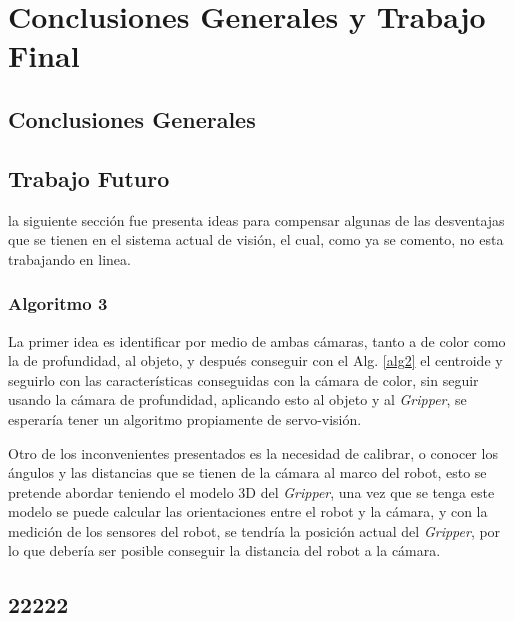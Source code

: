 \chapter{Conclusiones Generales y Trabajo Final}











\section{Conclusiones Generales}



\section{Trabajo Futuro}

la siguiente sección fue presenta ideas para compensar algunas de las desventajas que se tienen en el sistema actual de visión, el cual, como ya se comento, no esta trabajando en linea.

\subsection{Algoritmo  3}

La primer idea es identificar por medio de ambas cámaras, tanto a de color como la de profundidad, al objeto, y después conseguir con el Alg. \ref{alg2} el centroide y seguirlo con las características conseguidas con la cámara de color, sin seguir usando la cámara de profundidad, aplicando esto al objeto y al \textit{Gripper}, se esperaría tener un algoritmo propiamente de servo-visión.

Otro de los inconvenientes presentados es la necesidad de calibrar, o conocer los ángulos y las distancias que se tienen de la cámara al marco del robot, esto se pretende abordar teniendo el modelo 3D del \textit{Gripper}, una vez que se tenga este modelo se puede calcular las orientaciones entre el robot y la cámara, y con la medición de los sensores del robot, se tendría la posición actual del \textit{Gripper}, por lo que debería ser posible conseguir la distancia del robot a la cámara.






\section{22222}

